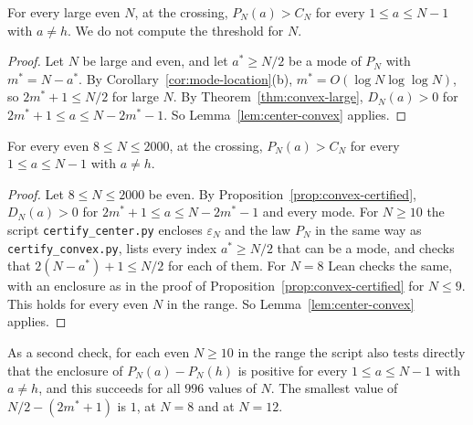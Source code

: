 \begin{corollary}\label{cor:unique-min}
For every large even $N$, at the crossing, $P_N(a)>C_N$ for every
$1\le a\le N-1$ with $a\ne h$. We do not compute the threshold for $N$.
\end{corollary}

\begin{proof}
Let $N$ be large and even, and let $a^*\ge N/2$ be a mode of $P_N$ with $m^*=N-a^*$. By
Corollary~\ref{cor:mode-location}(b), $m^*=O(\log N\log\log N)$, so $2m^*+1\le N/2$ for large
$N$. By Theorem~\ref{thm:convex-large}, $D_N(a)>0$ for $2m^*+1\le a\le N-2m^*-1$. So
Lemma~\ref{lem:center-convex} applies.
\end{proof}

\begin{proposition}\label{prop:center-small}
For every even $8\le N\le2000$, at the crossing, $P_N(a)>C_N$ for every $1\le a\le N-1$
with $a\ne h$.
\end{proposition}

\begin{proof}
Let $8\le N\le2000$ be even. By Proposition~\ref{prop:convex-certified}, $D_N(a)>0$ for
$2m^*+1\le a\le N-2m^*-1$ and every mode. For $N\ge10$ the script \texttt{certify\_center.py}
encloses $\varepsilon_N$ and the law $P_N$ in the same way as \texttt{certify\_convex.py}, lists
every index $a^*\ge N/2$ that can be a mode, and checks that $2(N-a^*)+1\le N/2$ for each of them.
For $N=8$ Lean checks the same, with an enclosure as in the proof of
Proposition~\ref{prop:convex-certified} for $N\le9$. This holds for every even $N$ in the range.
So Lemma~\ref{lem:center-convex} applies.
\end{proof}

As a second check, for each even $N\ge10$
in the range the script also tests directly that the enclosure of $P_N(a)-P_N(h)$ is positive for
every $1\le a\le N-1$ with $a\ne h$, and this succeeds for all $996$ values of $N$. The smallest value of
$N/2-(2m^*+1)$ is $1$, at $N=8$ and at $N=12$.
